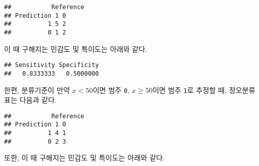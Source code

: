 \documentclass[
]{book}
\newenvironment{Shaded}{\begin{snugshade}}{\end{snugshade}}
\newcommand{\AttributeTok}[1]{\textcolor[rgb]{0.77,0.63,0.00}{#1}}
\newcommand{\DecValTok}[1]{\textcolor[rgb]{0.00,0.00,0.81}{#1}}
\newcommand{\FunctionTok}[1]{\textcolor[rgb]{0.00,0.00,0.00}{#1}}
\newcommand{\NormalTok}[1]{#1}
\newcommand{\OtherTok}[1]{\textcolor[rgb]{0.56,0.35,0.01}{#1}}
\newcommand{\SpecialCharTok}[1]{\textcolor[rgb]{0.00,0.00,0.00}{#1}}
\newcommand{\StringTok}[1]{\textcolor[rgb]{0.31,0.60,0.02}{#1}}
\begin{document}
\begin{verbatim}
##           Reference
## Prediction 1 0
##          1 5 2
##          0 1 2
\end{verbatim}

이 때 구해지는 민감도 및 특이도는 아래와 같다.

\begin{Shaded}
\end{Shaded}

\begin{verbatim}
## Sensitivity Specificity 
##   0.8333333   0.5000000
\end{verbatim}

한편, 분류기준이 만약 \(x < 50\)이면 범주 \texttt{0}, \(x \geq 50\)이면 범주 \texttt{1}로 추정할 때, 정오분류표는 다음과 같다.

\begin{Shaded}
\end{Shaded}

\begin{verbatim}
##           Reference
## Prediction 1 0
##          1 4 1
##          0 2 3
\end{verbatim}

또한, 이 때 구해지는 민감도 및 특이도는 아래와 같다.

\begin{Shaded}
\end{Shaded}
\end{document}
